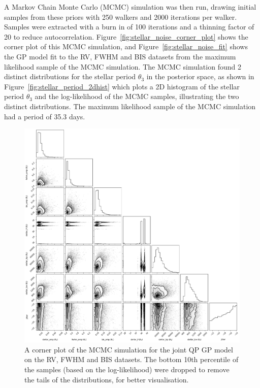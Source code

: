 A Markov Chain Monte Carlo (MCMC) simulation was then run, drawing initial samples from these priors with 250 walkers and
2000 iterations per walker.
Samples were extracted with a burn in of 100 iterations and a thinning factor of 20 to reduce autocorrelation.
Figure~\eqref{fig:stellar_noise_corner_plot} shows the corner plot of this MCMC simulation, and
Figure~\eqref{fig:stellar_noise_fit} shows the GP model fit to the RV, FWHM and BIS datasets from the maximum likelihood
sample of the MCMC simulation.
The MCMC simulation found 2 distinct distributions for the stellar period $\theta_{3}$ in the posterior space, as shown
in Figure~\eqref{fig:stellar_period_2dhist} which plots a 2D histogram of the stellar period $\theta_{3}$ and the log-likelihood
of the MCMC samples, illustrating the two distinct distributions.
The maximum likelihood sample of the MCMC simulation had a period of 35.3 days.

\begin{figure}[htb]
    \centering
    \includegraphics[width=1\textwidth]{figures/stellar_noise_corner_plot}
    \caption{A corner plot of the MCMC simulation for the joint QP GP model on the RV, FWHM and BIS datasets.
    The bottom 10th percentile of the samples (based on the log-likelihood) were dropped to remove the tails of the distributions,
    for better visualisation.}
    \label{fig:stellar_noise_corner_plot}
\end{figure}

